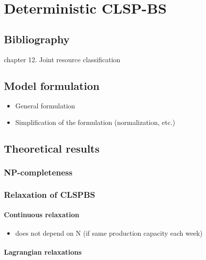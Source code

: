 \chapter{Deterministic CLSP-BS}
\label{chap:PDP - deterministic}


\section{Bibliography}

\cite{Pochet2006} chapter 12. Joint resource classification



\section{Model formulation}

\begin{itemize}
  \item General formulation
  \item Simplification of the formulation (normalization, etc.)
\end{itemize}


\section{Theoretical results}


\subsection{NP-completeness}


\subsection{Relaxation of CLSPBS}

\subsubsection{Continuous relaxation}

\begin{itemize}
  \item does not depend on N (if same production capacity each week)
\end{itemize}

\subsubsection{Lagrangian relaxations}

